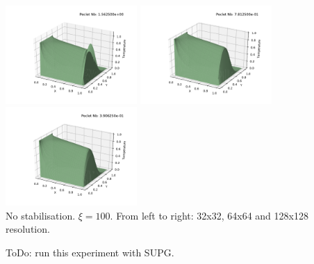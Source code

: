 \begin{center}
\includegraphics[width=5cm]{python_codes/fieldstone_65/results/exp3/solution100.pdf}
\includegraphics[width=5cm]{python_codes/fieldstone_65/results/exp3/solution100_x2.pdf}
\includegraphics[width=5cm]{python_codes/fieldstone_65/results/exp3/solution100_x4.pdf}\\
{\captionfont No stabilisation. $\xi=100$. From left to right: 32x32, 64x64 and 128x128 resolution.}
\end{center}

ToDo: run this experiment with SUPG.




